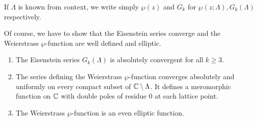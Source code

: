 \begin{notation}
	If $\Lambda$ is known from context, we write simply
	$\wp(z)$ and $G_k$ for $\wp(z; \Lambda), G_k(\Lambda)$
	respectively.
\end{notation}

Of course, we have to show that the Eisenstein series converge
and the Weierstrass
$\wp$-function are well defined and elliptic.

\begin{proposition}
	\label{prop:wp-properties}
	\begin{enumerate}[label=(\alph*)]
		\item	The Eisenstein series $G_k(\Lambda)$ is absolutely convergent
			for all $k \geq 3$.
		\item The series defining the Weierstrass $\wp$-function converges
			absolutely and uniformly on every compact subset of
			$\mathbb{C}\setminus\Lambda$. It defines a meromorphic function on $\mathbb{C}$ with 
			double poles of residue 0 at each lattice point.
		\item The Weierstrass $\wp$-function is an even elliptic function.
	\end{enumerate}
\end{proposition}


